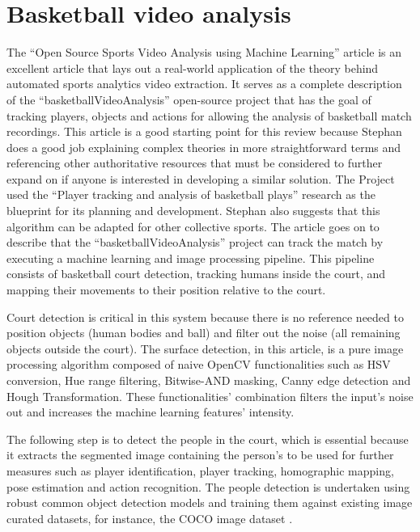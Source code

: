\documentclass[
    11pt,
    oneside
]{report}
\begin{document}
\section{Basketball video analysis}


The ``Open Source Sports Video Analysis using Machine Learning'' article \cite{stephan} is an excellent article that lays out a real-world application of the theory behind automated sports analytics video extraction. It serves as a complete description of the ``basketballVideoAnalysis'' open-source project \cite{stephan_code} that has the goal of tracking players, objects and actions for allowing the analysis of basketball match recordings. This article is a good starting point for this review because Stephan does a good job explaining complex theories in more straightforward terms and referencing other authoritative resources that must be considered to further expand on if anyone is interested in developing a similar solution. The Project used the ``Player tracking and analysis of basketball plays'' \cite{baskettrack} research as the blueprint for its planning and development. Stephan also suggests that this algorithm can be adapted for other collective sports. The article \cite{stephan} goes on to describe that the ``basketballVideoAnalysis'' project can track the match by executing a machine learning and image processing pipeline. This pipeline consists of basketball court detection, tracking humans inside the court, and mapping their movements to their position relative to the court.


Court detection is critical in this system because there is no reference needed to position objects (human bodies and ball) and filter out the noise (all remaining objects outside the court). The surface detection, in this article, is a pure image processing algorithm composed of naive OpenCV \cite{opencv} functionalities such as HSV conversion, Hue range filtering, Bitwise-AND masking, Canny edge detection and Hough Transformation. These functionalities' combination filters the input's noise out and increases the machine learning features' intensity.


The following step is to detect the people in the court, which is essential because it extracts the segmented image containing the person's to be used for further measures such as player identification, player tracking, homographic mapping, pose estimation and action recognition. The people detection is undertaken using robust common object detection models and training them against existing image curated datasets, for instance, the COCO image dataset \cite{cocodataset}.
\end{document}
